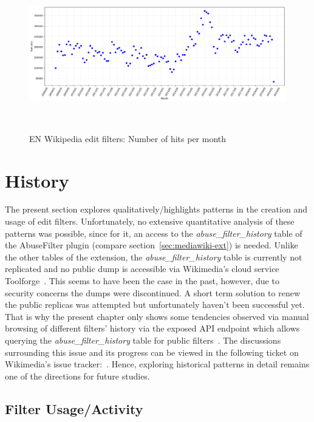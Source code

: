 \begin{figure}
\centering
  \includegraphics[width=0.9\columnwidth]{pics/filter-hits-zoomed.png}
  \caption{EN Wikipedia edit filters: Number of hits per month}~\label{fig:filter-hits}
\end{figure}


\section{History}

The present section explores qualitatively/highlights patterns in the creation and usage of edit filters.
Unfortunately, no extensive quantitative analysis of these patterns was possible, since for it, an access to the \emph{abuse\_filter\_history} table of the AbuseFilter plugin (compare section~\ref{sec:mediawiki-ext}) is needed.
Unlike the other tables of the extension, the \emph{abuse\_filter\_history} table is currently not replicated and no public dump is accessible via Wikimedia's cloud service Toolforge~\cite{Wikimedia:Toolforge}.
This seems to have been the case in the past, however, due to security concerns the dumps were discontinued.
A short term solution to renew the public replicas was attempted but unfortunately haven't been successful yet.
That is why the present chapter only shows some tendencies observed via manual browsing of different filters' history via the exposed API endpoint which allows querying the \emph{abuse\_filter\_history} table for public filters~\cite{Wikipedia:AbuseFilterHistory}.
The discussions surrounding this issue and its progress can be viewed in the following ticket on Wikimedia's issue tracker:~\cite{phabricator}.
Hence, exploring historical patterns in detail remains one of the directions for future studies.

\subsection{Filter Usage/Activity}

